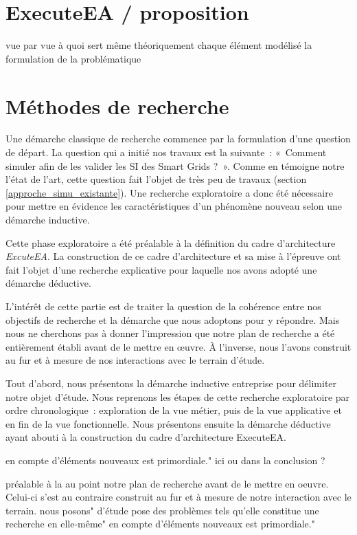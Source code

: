 \section{ExecuteEA / proposition}
vue par vue 
à quoi sert même théoriquement chaque élément modélisé 
la formulation de la problématique 


\section{Méthodes de recherche}
Une démarche classique de recherche commence par la formulation d'une question 
de départ. La question qui a initié nos travaux est la suivante~: «~Comment 
simuler afin de les valider les SI des Smart Grids ?~».  Comme en témoigne notre 
l'état de l'art, cette question fait l'objet de très peu de travaux (section 
\ref{approche_simu_existante}). Une recherche exploratoire a donc été nécessaire 
pour mettre en évidence les caractéristiques d'un phénomène nouveau selon une 
démarche inductive. 

Cette phase exploratoire a été préalable à la définition du cadre d'architecture 
\textit{ExcuteEA}. La construction de ce cadre d'architecture et sa mise à 
l'épreuve ont fait l'objet d'une recherche explicative pour laquelle nos avons 
adopté une démarche déductive.

L'intérêt de cette partie est de traiter la question de la cohérence entre nos 
objectifs de recherche et la démarche que nous adoptons pour y répondre. Mais 
nous ne cherchons pas à donner l'impression que notre plan de recherche a été 
entièrement établi avant de le mettre en œuvre. À l'inverse, nous l'avons 
construit au fur et à mesure de nos interactions avec le terrain d'étude. 

Tout d'abord, nous présentons la démarche inductive entreprise pour délimiter 
notre objet d'étude. Nous reprenons les étapes de cette recherche exploratoire 
par ordre chronologique~: exploration de la vue métier, puis de la vue 
applicative et en fin de la vue fonctionnelle. Nous présentons ensuite la 
démarche déductive ayant abouti à la construction du cadre d'architecture 
ExecuteEA.

en compte d'éléments nouveaux est primordiale." ici ou dans la conclusion ?

préalable à la 
au point notre plan de recherche avant de le mettre en oeuvre. Celui-ci s'est au 
contraire construit au fur et à mesure de notre interaction avec le terrain.
%
nous posons"
d'étude pose des problèmes tels qu'elle constitue une recherche en elle-même"
en compte d'éléments nouveaux est primordiale."


